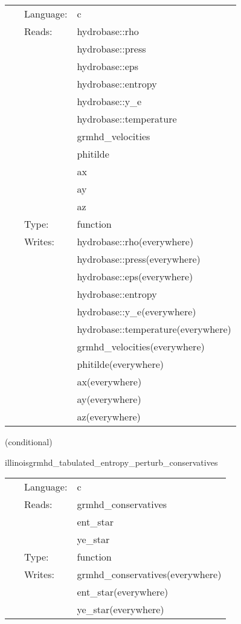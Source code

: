 \hspace{5mm}

 \begin{tabular*}{160mm}{cll} 
~ & Language:  & c \\ 
~ & Reads:  & hydrobase::rho \\ 
~& ~ &hydrobase::press\\ 
~& ~ &hydrobase::eps\\ 
~& ~ &hydrobase::entropy\\ 
~& ~ &hydrobase::y\_e\\ 
~& ~ &hydrobase::temperature\\ 
~& ~ &grmhd\_velocities\\ 
~& ~ &phitilde\\ 
~& ~ &ax\\ 
~& ~ &ay\\ 
~& ~ &az\\ 
~ & Type:  & function \\ 
~ & Writes:  & hydrobase::rho(everywhere) \\ 
~& ~ &hydrobase::press(everywhere)\\ 
~& ~ &hydrobase::eps(everywhere)\\ 
~& ~ &hydrobase::entropy\\ 
~& ~ &hydrobase::y\_e(everywhere)\\ 
~& ~ &hydrobase::temperature(everywhere)\\ 
~& ~ &grmhd\_velocities(everywhere)\\ 
~& ~ &phitilde(everywhere)\\ 
~& ~ &ax(everywhere)\\ 
~& ~ &ay(everywhere)\\ 
~& ~ &az(everywhere)\\ 
\end{tabular*} 


\vspace{5mm}

   (conditional) 

\hspace{5mm} illinoisgrmhd\_tabulated\_entropy\_perturb\_conservatives 

\hspace{5mm}{\it entropy+tabulated version of illinoisgrmhd\_perturb\_conservatives } 


\hspace{5mm}

 \begin{tabular*}{160mm}{cll} 
~ & Language:  & c \\ 
~ & Reads:  & grmhd\_conservatives \\ 
~& ~ &ent\_star\\ 
~& ~ &ye\_star\\ 
~ & Type:  & function \\ 
~ & Writes:  & grmhd\_conservatives(everywhere) \\ 
~& ~ &ent\_star(everywhere)\\ 
~& ~ &ye\_star(everywhere)\\ 
\end{tabular*} 


